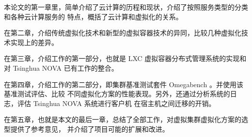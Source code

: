 本论文的第一章里，简单介绍了云计算的历程和现状，介绍了按照服务类型的分类和各种云计算服务的
特点，概括了云计算和虚拟化的关系。

在第二章，介绍传统虚拟化技术和新型的虚拟容器技术的异同，比较几种虚拟化技术实现上的差异。

在第三章，介绍工作的第一部分，也就是 LXC 虚拟容器分布式管理系统的实现和对 Tsinghua NOVA
已有工作的整合。

在第四章，介绍工作的第二部分，即集群基准测试套件 Omegabench 。并使用该基准测试评估、比较
不同虚拟化方案的性能表现。另外，还通过分析系统的日志，评估 Tsinghua NOVA 系统进行客户机
在宿主机之间迁移的开销。

在第五章，也就是本文的最后一章，总结了全部工作，对虚拟集群虚拟化方案的选型提供了参考意见，
并介绍了项目可能的扩展和改进。
